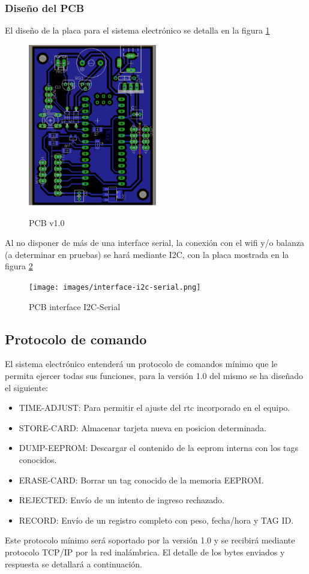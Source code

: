 \subsubsection{Dise\~no del PCB}
El dise\~no de la placa para el sistema electr\'onico se detalla en la figura \ref{fig:pcb}
\begin{figure}[h!]
	\caption{PCB v1.0}
	\includegraphics[width=0.5\textwidth]{images/weightlogger_pcb}
	\label{fig:pcb}
\end{figure}

Al no disponer de más de una interface serial, la conexión con el wifi y/o balanza (a determinar en pruebas) 
se hará mediante I2C, con la placa mostrada en la figura \ref{fig:pcb-i2c}
\begin{figure}[h!]
  \caption{PCB interface I2C-Serial}
  \texttt{[image: images/interface-i2c-serial.png]}
  \label{fig:pcb-i2c}
\end{figure}

\subsection{Protocolo de comando}
El sistema electrónico entenderá un protocolo de comandos mínimo que le permita ejercer todas sus funciones, para la versión 1.0 del mismo se ha diseñado el siguiente:
\begin{itemize}
	\item TIME-ADJUST: Para permitir el ajuste del rtc incorporado en el equipo.
	\item STORE-CARD: Almacenar tarjeta nueva en posicion determinada.
	\item DUMP-EEPROM: Descargar el contenido de la eeprom interna con los tags conocidos.
	\item ERASE-CARD: Borrar un tag conocido de la memoria EEPROM.
	\item REJECTED: Envío de un intento de ingreso rechazado.
	\item RECORD: Envío de un registro completo con peso, fecha/hora y TAG ID.
\end{itemize}
Este protocolo mínimo será soportado por la versión 1.0 y se recibirá mediante protocolo TCP/IP por la red inalámbrica. El detalle de los bytes enviados y respuesta se detallará a continuación.


